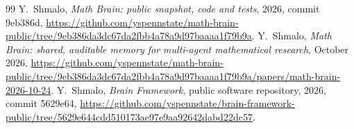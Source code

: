 \documentclass[11pt]{amsart}
\theoremstyle{remark}
\numberwithin{equation}{section}
\begin{document}
\begin{thebibliography}{99}
 Y.~Shmalo, \emph{Math Brain: public snapshot, code and tests}, 2026, commit 9eb386d, \url{https://github.com/yspennstate/math-brain-public/tree/9eb386da3dc67da2fbb4a78a9d97baaaa1f79b9a}.
 Y.~Shmalo, \emph{Math Brain: shared, auditable memory for multi-agent mathematical research}, October 2026, \url{https://github.com/yspennstate/math-brain-public/tree/9eb386da3dc67da2fbb4a78a9d97baaaa1f79b9a/papers/math-brain-2026-10-24}.
 Y.~Shmalo, \emph{Brain Framework}, public software repository, 2026, commit 5629e64, \url{https://github.com/yspennstate/brain-framework-public/tree/5629e644cdd510173ae97e9aa92642dabd22dc57}.
\end{thebibliography}
\end{document}
